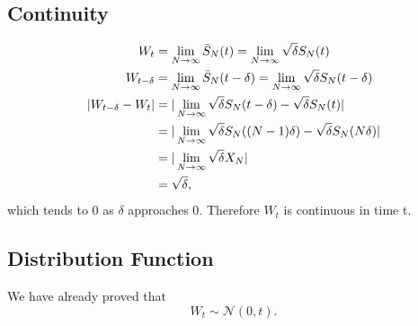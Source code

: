 \subsection{Continuity}
\begin{align}
   W_t&=\lim_{N\rightarrow \infty} \bar{S}_N(t)=\lim_{N\rightarrow \infty} \sqrt{\delta} S_N(t)\\
   W_{t-\delta}&=\lim_{N\rightarrow \infty} \bar{S}_N(t-\delta)=\lim_{N\rightarrow \infty} \sqrt{\delta} S_N(t-\delta)\\
   |W_{t-\delta}-W_t|&=|\lim_{N\rightarrow \infty} \sqrt{\delta} S_N(t-\delta)-\sqrt{\delta}S_N(t)|\\\notag
   &=|\lim_{N\rightarrow \infty} \sqrt{\delta} S_N((N-1)\delta)-\sqrt{\delta}S_N(N \delta)|\\\notag
   &=|\lim_{N\rightarrow \infty} \sqrt{\delta} X_{N}|\\\notag
   &=\sqrt{\delta},
\end{align}
which tends to 0 as $\delta$ approaches 0. Therefore $W_t$ is continuous in time t.

\subsection{Distribution Function}
We have already proved that
\begin{equation}
   W_t \sim \mathcal{N}(0,t).
\end{equation}

